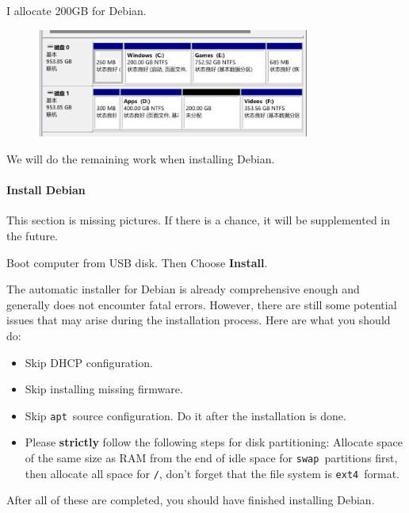 \documentclass[12pt]{ctexart}
\newenvironment{mdquote}
{%
  \par\noindent
  \begin{list}{}{%
      \setlength{\leftmargin}{1em}%
      \setlength{\rightmargin}{0pt}%
      \setlength{\itemindent}{0pt}%
      \setlength{\listparindent}{\parindent}%
      \setlength{\topsep}{0.5\baselineskip}%
  }
  \item[\textbf{>}\ ]\itshape
}
{\end{list}\par}
\begin{document}
I allocate 200GB for Debian.

\begin{figure}[H]
    \centering
    \includegraphics[width=0.8\textwidth,keepaspectratio]{assets/Linux/3.1 Seek common ground while reserving differences/8.png}
\end{figure}

We will do the remaining work when installing Debian.

\paragraph{\textbf{Install Debian}}\par
\vspace{1em}
\begin{mdquote}
This section is missing pictures. If there is a chance, it will be
supplemented in the future. 
\end{mdquote}

Boot computer from USB disk. Then Choose
\textbf{Install}.

The automatic installer for Debian is already comprehensive enough and
generally does not encounter fatal errors. However, there are still some
potential issues that may arise during the installation process. Here
are what you should do:

\begin{itemize}
\item
  Skip DHCP configuration.
\item
  Skip installing missing firmware.
\item
  Skip \texttt{apt}\ source configuration. Do it after the installation
  is done.
\item
  Please \textbf{strictly} follow the following steps for disk
  partitioning: Allocate space of the same size as RAM from the end of
  idle space for \texttt{swap}\ partitions first, then allocate all space
  for \texttt{/}, don't forget that the file system is
  \texttt{ext4}\ format.
\end{itemize}

After all of these are completed, you should have finished installing
Debian.
\end{document}
